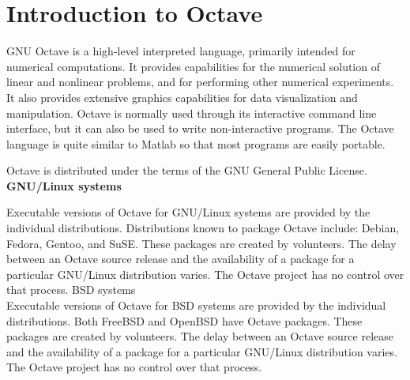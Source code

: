 \newpage
\section{ Introduction to Octave}

 GNU Octave is a high-level interpreted language, primarily intended for numerical computations. It provides capabilities for the numerical solution of linear and nonlinear problems, and for performing other numerical experiments. It also provides extensive graphics capabilities for data visualization and manipulation. Octave is normally used through its interactive command line interface, but it can also be used to write non-interactive programs. The Octave language is quite similar to Matlab so that most programs are easily portable.

 Octave is distributed under the terms of the GNU General Public License.\\ 
 
 \textbf{GNU/Linux systems}
 
 Executable versions of Octave for GNU/Linux systems are provided by the individual distributions. Distributions known to package Octave include: Debian, Fedora, Gentoo, and SuSE. These packages are created by volunteers. The delay between an Octave source release and the availability of a package for a particular GNU/Linux distribution varies. The Octave project has no control over that process. 
 BSD systems\\
 
 Executable versions of Octave for BSD systems are provided by the individual distributions. Both FreeBSD and OpenBSD have Octave packages. These packages are created by volunteers. The delay between an Octave source release and the availability of a package for a particular GNU/Linux distribution varies. The Octave project has no control over that process.\\
 
